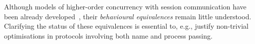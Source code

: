 Although models of higher-order concurrency with session 
communication %
have been already developed~\cite{tlca07,DBLP:journals/jfp/GayV10},
their \emph{behavioural equivalences} 
remain little understood. 
Clarifying the status of these equivalences is essential to, e.g., 
justify non-trivial optimisations in protocols involving both name and process passing.





